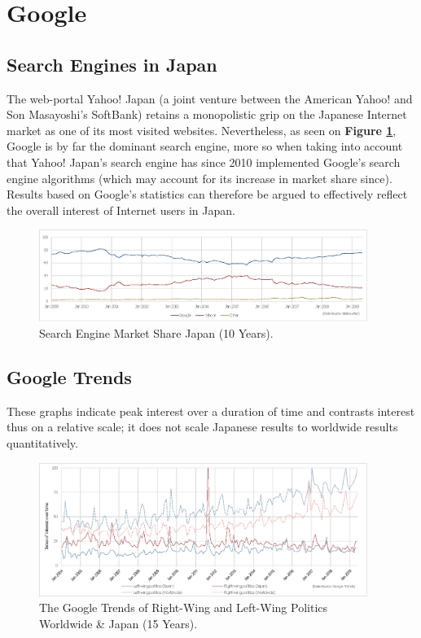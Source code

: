 \documentclass[10pt,british,A4paper,twoside]{memoir}
\begin{document}
\section{Google}\label{google}

\subsection{Search Engines in Japan}\label{search-engines-in-japan}

The web-portal Yahoo! Japan (a joint venture between the American Yahoo!
and Son Masayoshi's SoftBank) retains a monopolistic grip on the
Japanese Internet market as one of its most visited websites.
Nevertheless, as seen on \textbf{Figure \ref{fig:searchengine}}, Google
is by far the dominant search engine, more so when taking into account
that Yahoo! Japan's search engine has since 2010 implemented Google's
search engine algorithms (which may account for its increase in market
share since). Results based on Google's statistics can therefore be
argued to effectively reflect the overall interest of Internet users in
Japan.

\begin{figure}[!htb]
 \centering
 \caption{\label{fig:searchengine} Search Engine Market Share Japan (10 Years).}
 \includegraphics[width=0.95\textwidth,trim=4 4 4 4,clip]{images/searchengine.eps}
 \end{figure}

\subsection{Google Trends}\label{google-trends}

\label{appendix:googletrends}

These graphs indicate peak interest over a duration of time and
contrasts interest thus on a relative scale; it does not scale Japanese
results to worldwide results quantitatively.

\begin{figure}[!htb]
 \caption{\label{fig:politictrends} The Google Trends of Right-Wing and Left-Wing Politics Worldwide \& Japan (15 Years).}
 \centering 
 \includegraphics[width=0.95\textwidth,trim=4 4 4 4,clip]{images/politictrends.eps}
\end{figure}
\end{document}
